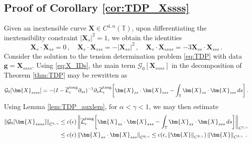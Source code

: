 \documentclass[11pt,reqno]{amsart}
\newcommand{\T}{\mathbb{T}}
\newcommand{\X}{\bm{X}}
\newcommand{\p}{\partial}
\newcommand{\abs}[1]{\left\lvert #1 \right\rvert}
\newcommand{\norm}[1]{\left\lVert #1 \right\rVert}
\newcommand{\mc}[1]{\mathcal{#1}}
\theoremstyle{definition}
\begin{document}
\subsection{Proof of Corollary \ref{cor:TDP_Xssss}}\label{subsec:cor_TDP_Xssss}
Given an inextensible curve $\X\in C^{4,\alpha}(\T)$, upon differentiating the inextensibility constraint $\abs{\X_s}^2=1$, we obtain the identities 
\begin{equation}\label{eq:X_IDs}
  \X_s\cdot\X_{ss}=0\,, \quad 
  \X_s\cdot\X_{sss}=-\abs{\X_{ss}}^2\,, \quad 
  \X_s\cdot\X_{ssss}=-3\X_{ss}\cdot\X_{sss}\,.
\end{equation}
Consider the solution to the tension determination problem \eqref{eq:TDP} with data $\bm{g}=\X_{ssss}$. Using \eqref{eq:X_IDs}, the main term $\mc{G}_0[\X_{ssss}]$ in the decomposition of Theorem \ref{thm:TDP} may be rewritten as 
\begin{equation}
  \mc{G}_0[\X_{ssss}] = -(I- \overline{\mc{L}}_\epsilon^{\rm tang}\p_{ss})^{-1}\p_s\overline{\mc{L}}_\epsilon^{\rm tang}\bigg[\X_{ss}\cdot\X_{sss}-\int_{\T}\X_{ss}\cdot\X_{sss}\,ds \bigg]\,.
\end{equation}
%
%
Using Lemma \ref{lem:TDP_auxlem}, for $\alpha<\gamma<1$, we may then estimate 
\begin{equation}
\begin{aligned}
  \norm{\mc{G}_0[\X_{ssss}]}_{C^{1,\gamma}} &\le c(\epsilon)\norm{\overline{\mc{L}}_\epsilon^{\rm tang}\bigg[\X_{ss}\cdot\X_{sss}-\int_{\T}\X_{ss}\cdot\X_{sss}\,ds \bigg]}_{C^{1,\gamma}}\\
  &\le c(\epsilon)\norm{\X_{ss}\cdot\X_{sss}}_{C^{0,\gamma}}
  \le c(\epsilon,\norm{\X}_{C^{2,\gamma}})\norm{\X}_{C^{3,\gamma}}\,.
\end{aligned}
\end{equation}
\end{document}
